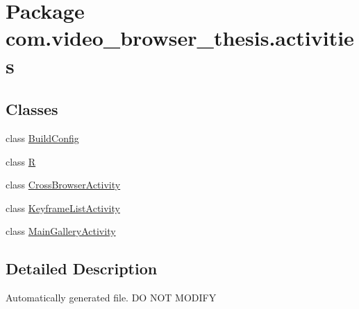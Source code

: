 \hypertarget{namespacecom_1_1video__browser__thesis_1_1activities}{\section{Package com.\-video\-\_\-browser\-\_\-thesis.\-activities}
\label{namespacecom_1_1video__browser__thesis_1_1activities}
}
\subsection*{Classes}
\begin{DoxyCompactItemize}
\item 
class \hyperlink{classcom_1_1video__browser__thesis_1_1activities_1_1_build_config}{Build\-Config}
\item 
class \hyperlink{classcom_1_1video__browser__thesis_1_1activities_1_1_r}{R}
\item 
class \hyperlink{classcom_1_1video__browser__thesis_1_1activities_1_1_cross_browser_activity}{Cross\-Browser\-Activity}
\item 
class \hyperlink{classcom_1_1video__browser__thesis_1_1activities_1_1_keyframe_list_activity}{Keyframe\-List\-Activity}
\item 
class \hyperlink{classcom_1_1video__browser__thesis_1_1activities_1_1_main_gallery_activity}{Main\-Gallery\-Activity}
\end{DoxyCompactItemize}


\subsection{Detailed Description}
Automatically generated file. D\-O N\-O\-T M\-O\-D\-I\-F\-Y 